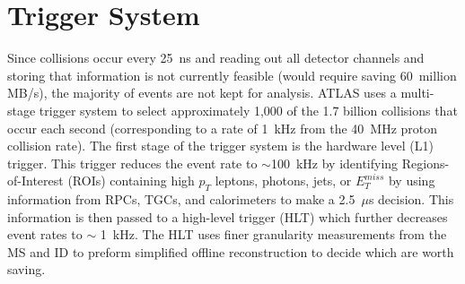 \section{Trigger System}
Since collisions occur every 25~ns and reading out all detector channels and storing that information is not currently feasible (would require saving 60~million MB/s), the majority of events are not kept for analysis. ATLAS uses a multi-stage trigger system to select approximately 1,000 of the 1.7 billion collisions that occur each second (corresponding to a rate of 1~kHz from the 40~MHz proton collision rate). The first stage of the trigger system is the hardware level (L1) trigger. This trigger reduces the event rate to $\sim$100~kHz by identifying Regions-of-Interest (ROIs) containing high $p_{T}$ leptons, photons, jets, or $E_{T}^{miss}$ by using information from RPCs, TGCs, and calorimeters to make a 2.5~$\mu$s decision. This information is then passed to a high-level trigger (HLT) which further decreases event rates to $\sim$ 1~kHz. The HLT uses finer granularity measurements from the MS and ID to preform simplified offline reconstruction to decide which are worth saving.
